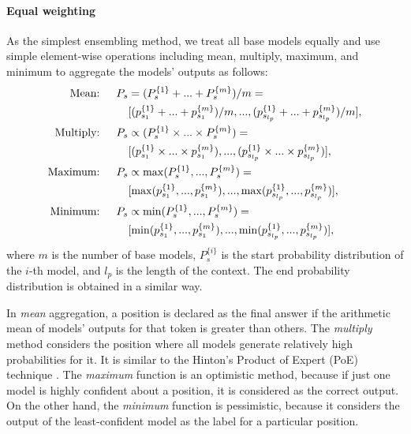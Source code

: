 \documentclass[review]{elsarticle}
\begin{document}
\paragraph{Equal weighting}
As the simplest ensembling method, we treat all base models equally and use simple element-wise operations including mean, multiply, maximum, and minimum to aggregate the models' outputs as follows: 
\begin{equation}
\label{eq:simple}
\begin{aligned}
\text{Mean:}\hspace{15px}
P_{s}&=(P^{\{1\}}_{s}+...+P^{\{m\} }_{s})/m=\\&[(p^{\{1\}}_{s_{1}}+...+p^{\{m\}}_{s_{1}})/m,...,(p^{\{1\}}_{s_{l_{p}}}+...+p^{\{m\}}_{s_{l_{p}}})/m],
\\
\text{Multiply:}\hspace{15px}
P_{s}&\propto(P^{\{1\}}_{s}\times...\times P^{\{m\}}_{s})=\\&[(p^{\{1\}}_{s_{1}}\times...\times p^{\{m\}}_{s_{1}}),...,(p^{\{1\}}_{s_{l_{p}}}\times...\times p^{\{m\}}_{s_{l_{p}}})],
\\
\text{Maximum:}\hspace{15px}
P_{s}&\propto\max(P^{\{1\}}_{s},...,P^{\{m\}}_{s})=\\&[\max(p^{\{1\}}_{s_{1}},...,p^{\{m\}}_{s_{1}}),...,\max(p^{\{1\}}_{s_{l_{p}}},...,p^{\{m\}}_{s_{l_{p}}})],
\\
\text{Minimum:}\hspace{15px}
P_{s}&\propto\min(P^{\{1\}}_{s},...,P^{\{m\}}_{s})=\\&[\min(p^{\{1\}}_{s_{1}},...,p^{\{m\}}_{s_{1}}),...,\min(p^{\{1\}}_{s_{l_{p}}},...,p^{\{m\}}_{s_{l_{p}}})],
\end{aligned}
\end{equation}
where $m$ is the number of base models, $P^{\{i\}}_{s}$ is the start probability distribution of the $i$-th model, and $l_{p}$ is the length of the context. The end probability distribution is obtained in a similar way.

In \textit{mean} aggregation, a position is declared as the final answer if the arithmetic mean of models' outputs for that token is greater than others. The \textit{multiply} method considers the position where all models generate relatively high probabilities for it. It is similar to the Hinton's Product of Expert (PoE) technique \cite{hinton2002training}. The \textit{maximum} function is an optimistic method, because if just one model is highly confident about a position, it is considered as the correct output. On the other hand, the \textit{minimum} function is pessimistic, because it considers the output of the least-confident model as the label for a particular position. 
\end{document}
